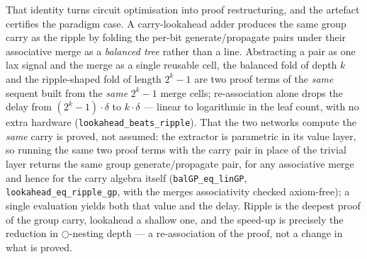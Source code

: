 That identity turns circuit optimisation into proof restructuring, and
the artefact certifies the paradigm case. A carry-lookahead adder
produces the same group carry as the ripple by folding the per-bit
generate/propagate pairs under their associative merge as a
\emph{balanced tree} rather than a line. Abstracting a pair as one lax
signal and the merge as a single reusable cell, the balanced fold of
depth \ensuremath{k} and the ripple-shaped fold of length
\ensuremath{2^{k}-1} are two proof terms of the \emph{same} sequent
built from the \emph{same} \ensuremath{2^{k}-1} merge cells;
re-association alone drops the delay from
\ensuremath{(2^{k}-1)\cdot\delta} to \ensuremath{k\cdot\delta} --- linear
to logarithmic in the leaf count, with no extra hardware
(\texttt{lookahead\_beats\_ripple}). That the two networks compute the
\emph{same} carry is proved, not assumed: the extractor is parametric in
its value layer, so running the same two proof terms with the carry pair
in place of the trivial layer returns the same group
generate/propagate pair, for any associative merge and hence for the
carry algebra itself (\texttt{balGP\_eq\_linGP},
\texttt{lookahead\_eq\_ripple\_gp}, with the merge\textquotesingle s
associativity checked axiom-free); a single evaluation yields both that
value and the delay. Ripple is the deepest proof of the group carry,
lookahead a shallow one, and the speed-up is precisely the reduction in
\ensuremath{\bigcirc}-nesting depth --- a re-association of the proof, not
a change in what is proved.


